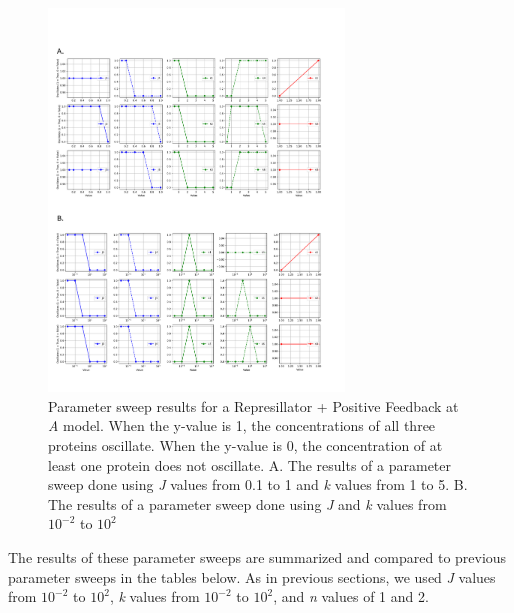 \documentclass{article}
\begin{document}

\begin{figure}[H]
    \centering
    \includegraphics[width=0.7\textwidth]{figure8.pdf}
    \caption{Parameter sweep results for a Represillator + Positive Feedback at \textit{A} model. When the y-value is 1, the concentrations of all three proteins oscillate. When the y-value is 0, the concentration of at least one protein does not oscillate. A. The results of a parameter sweep done using \textit{J} values from 0.1 to 1 and \textit{k} values from 1 to 5. B. The results of a parameter sweep done using \textit{J} and \textit{k} values from \( 10^{-2} \) to \( 10^{2} \) }
    \label{fig:8}
\end{figure}

The results of these parameter sweeps are summarized and compared to previous parameter sweeps in the tables below. As in previous sections, we used \textit{J} values from \( 10^{-2} \) to \( 10^{2} \), \textit{k} values from \( 10^{-2} \) to \( 10^{2} \), and \textit{n} values of 1 and 2.
\end{document}
